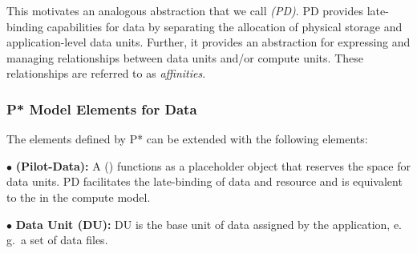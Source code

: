 \documentclass[conference]{IEEEtran}
\begin{document}


This motivates an analogous abstraction that we call \emph{\pilotdata
  (PD)}. PD provides late-binding capabilities for data by
separating the allocation of physical storage and application-level
data units. Further, it provides an abstraction for expressing and
managing relationships between data units and/or compute units. These
relationships are referred to as \emph{affinities}.


\subsubsection*{P* Model Elements for Data}


The elements defined by P* can be extended with the following elements:


\noindent$\bullet$
  \textbf{\pilot (Pilot-Data):} A \pilotdata (\pd) functions as a 
	placeholder object that reserves the space
	for data units. PD facilitates the late-binding of data and resource and is
	equivalent to the \pilot in the compute model.

\noindent$\bullet$
  \textbf{Data Unit (DU):} DU is the base unit of data assigned by
  the application,  e.\,g.\ a set of data files. 

\end{document}
